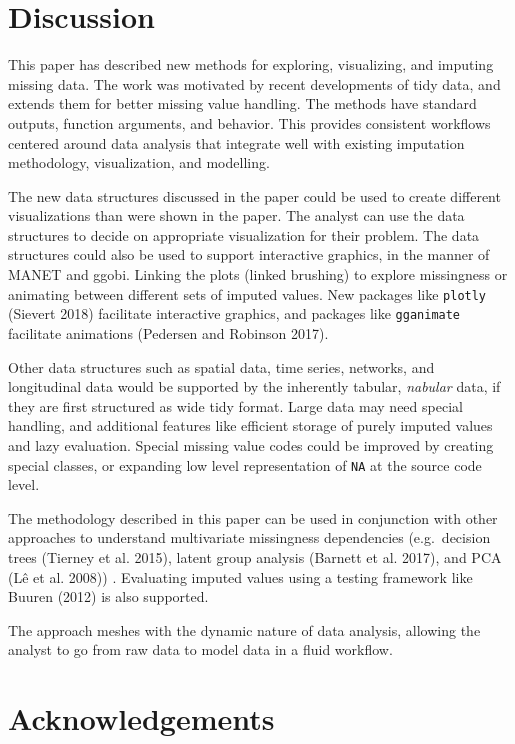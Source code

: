\documentclass[]{article}
\theoremstyle{definition}
\theoremstyle{definition}
\theoremstyle{definition}
\theoremstyle{remark}
\begin{document}
\hypertarget{discussion}{%
\section{Discussion}\label{discussion}}

This paper has described new methods for exploring, visualizing, and
imputing missing data. The work was motivated by recent developments of
tidy data, and extends them for better missing value handling. The
methods have standard outputs, function arguments, and behavior. This
provides consistent workflows centered around data analysis that
integrate well with existing imputation methodology, visualization, and
modelling.

The new data structures discussed in the paper could be used to create
different visualizations than were shown in the paper. The analyst can
use the data structures to decide on appropriate visualization for their
problem. The data structures could also be used to support interactive
graphics, in the manner of MANET and ggobi. Linking the plots (linked
brushing) to explore missingness or animating between different sets of
imputed values. New packages like \texttt{plotly} (Sievert 2018)
facilitate interactive graphics, and packages like \texttt{gganimate}
facilitate animations (Pedersen and Robinson 2017).

Other data structures such as spatial data, time series, networks, and
longitudinal data would be supported by the inherently tabular,
\emph{nabular} data, if they are first structured as wide tidy format.
Large data may need special handling, and additional features like
efficient storage of purely imputed values and lazy evaluation. Special
missing value codes could be improved by creating special classes, or
expanding low level representation of \texttt{NA} at the source code
level.

The methodology described in this paper can be used in conjunction with
other approaches to understand multivariate missingness dependencies
(e.g.~decision trees (Tierney et al. 2015), latent group analysis
(Barnett et al. 2017), and PCA (Lê et al. 2008)) . Evaluating imputed
values using a testing framework like Buuren (2012) is also supported.

The approach meshes with the dynamic nature of data analysis, allowing
the analyst to go from raw data to model data in a fluid workflow.

\newpage

\hypertarget{acknowledgements}{%
\section{Acknowledgements}\label{acknowledgements}}
\end{document}
